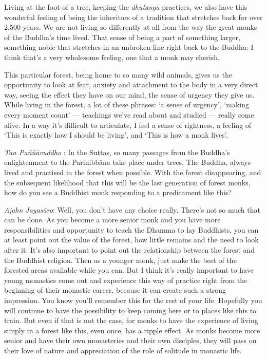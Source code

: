 Living at the foot of a tree, keeping the \emph{dhutanga} practices, we
also have this wonderful feeling of being the inheritors of a tradition
that stretches back for over 2,500 years. We are not living so
differently at all from the way the great monks of the Buddha's time
lived. That sense of being a part of something larger, something noble
that stretches in an unbroken line right back to the Buddha: I think
that's a very wholesome feeling, one that a monk may cherish.

This particular forest, being home to so many wild animals, gives us the
opportunity to look at fear, anxiety and attachment to the body in a
very direct way, seeing the effect they have on our mind, the sense of
urgency they give us. While living in the forest, a lot of these
phrases: `a sense of urgency', `making every moment count' --- teachings
we've read about and studied --- really come alive. In a way it's
difficult to articulate, I feel a sense of rightness, a feeling of `This
is exactly how I should be living', and `This is how a monk lives'.

\emph{Tan Paññāvuddho} : In the Suttas, so many passages from the
Buddha's enlightenment to the Parinibbāna take place under trees. The
Buddha, always lived and practised in the forest when possible. With the
forest disappearing, and the subsequent likelihood that this will be the
last generation of forest monks, how do you see a Buddhist monk
responding to a predicament like this?

\emph{Ajahn Jayasāro‎}: Well, you don't have any choice really. There's
not so much that can be done. As you become a more senior monk and you
have more responsibilities and opportunity to teach the Dhamma to lay
Buddhists, you can at least point out the value of the forest, how
little remains and the need to look after it. It's also important to
point out the relationship between the forest and the Buddhist religion.
Then as a younger monk, just make the best of the forested areas
available while you can. But I think it's really important to have young
monastics come out and experience this way of practice right from the
beginning of their monastic career, because it can create such a strong
impression. You know you'll remember this for the rest of your life.
Hopefully you will continue to have the possibility to keep coming here
or to places like this to train. But even if that is not the case, for
monks to have the experience of living simply in a forest like this,
even once, has a ripple effect. As monks become more senior and have
their own monasteries and their own disciples, they will pass on their
love of nature and appreciation of the role of solitude in monastic
life.

